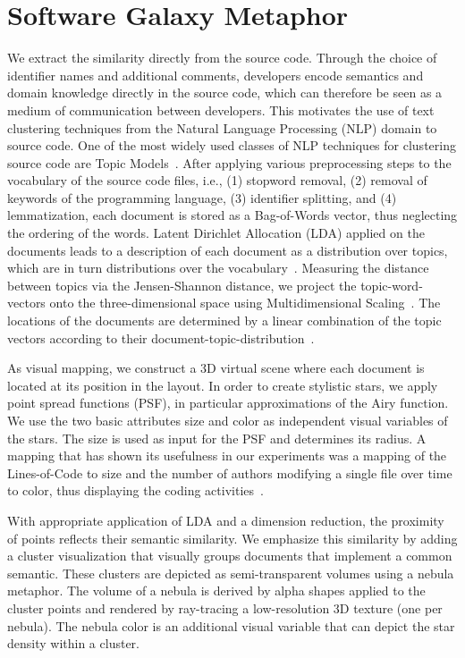 \documentclass[sigconf%
,natbib=true%
]{acmart}
\begin{document}
\section{Software Galaxy Metaphor}

We extract the similarity directly from the source code.
Through the choice of identifier names and additional comments, developers encode semantics and domain knowledge directly in the source code, which can therefore be seen as a medium of communication between developers.
This motivates the use of text clustering techniques from the Natural Language Processing (NLP) domain to source code.
One of the most widely used classes of NLP techniques for clustering source code are Topic Models~\cite{chen2016survey}.
After applying various preprocessing steps to the vocabulary of the source code files, i.e., (1) stopword removal, (2) removal of keywords of the programming language, (3) identifier splitting, and (4) lemmatization, each document is stored as a Bag-of-Words vector, thus neglecting the ordering of the words.
Latent Dirichlet Allocation (LDA) applied on the documents leads to a description of each document as a distribution over topics, which are in turn distributions over the vocabulary~\cite{blei2003latent}.
Measuring the distance between topics via the Jensen-Shannon distance, we project the topic-word-vectors onto the three-dimensional space using Multidimensional Scaling~\cite{cox2008multidimensional}.
The locations of the documents are determined by a linear combination of the topic vectors according to their document-topic-distribution~\cite{achssld2021-softwareforest}.

As visual mapping, we construct a 3D virtual scene where each document is located at its position in the layout.
In order to create stylistic stars, we apply point spread functions (PSF), in particular approximations of the Airy function.
We use the two basic attributes size and color as independent visual variables of the stars.
The size is used as input for the PSF and determines its radius.
A mapping that has shown its usefulness in our experiments was a mapping of the Lines-of-Code to size and the number of authors modifying a single file over time to color, thus displaying the coding activities~\cite{knoeschke2020-thesis}.

With appropriate application of LDA and a dimension reduction, the proximity of points reflects their semantic similarity.
We emphasize this similarity by adding a cluster visualization that visually groups documents that implement a common semantic.
These clusters are depicted as semi-transparent volumes using a nebula metaphor.
The volume of a nebula is derived by alpha shapes applied to the cluster points and rendered by ray-tracing a low-resolution 3D texture (one per nebula).
The nebula color is an additional visual variable that can depict the star density within a cluster.
\end{document}
